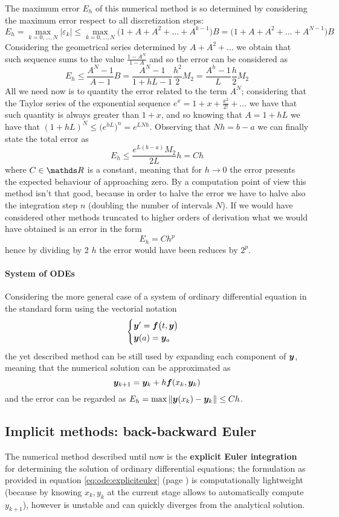 	The maximum error $E_h$ of this numerical method is so determined by considering the maximum error respect to all discretization steps:
	\[ E_h = \max_{k=0,\dots,N} |\varepsilon_k| \leq \max_{k=0,\dots,N} \big(1 + A + A^2 + \dots + A^{k-1}\big) B = \big(1 + A + A^2 + \dots + A^{N-1}\big) B\]
	Considering the geometrical series determined by $A+ A^2+\dots$ we obtain that such sequence sums to the value $\frac{1-A^N}{1-A}$ and so the error can be considered as
	\[ E_h \leq \frac{A^N-1}{A-1} B = \frac{A^N - 1}{1+hL - 1} \frac{h^2}{2}M_2 = \frac{A^h - 1}{L} \frac{h}2 M_2 \]
	All we need now is to quantity the error related to the  term $A^N$; considering that the Taylor series of the exponential sequence $e^x = 1 + x + \frac{x^2}{2!}+\dots$ we have that such quantity is always greater than $1+x$, and so knowing that $A= 1+hL$ we have that $(1+hL)^N \leq \big(e^{hL}\big)^n = e^{LNh}$. Observing that $Nh=b-a$ we can finally state the total error as
	\begin{equation}
		E_h\leq \frac{e^{L(b-a)} M_2}{2L} h = Ch
	\end{equation}
	where $C\in \R$ is a constant, meaning that for $h\rightarrow 0$ the error presents the expected behaviour of approaching zero. By a computation point of view this method isn't that good, because in order to halve the error we have to halve also the integration step $n$ (doubling the number of intervals $N$). If we would have considered other methods truncated to higher orders of derivation what we would have obtained is an error in the form
	\[ E_h = C h^p \]
	hence by dividing by 2 $h$ the error would have been reduces by $2^p$.
	
	\paragraph{System of ODEs} Considering the more general case of a system of ordinary differential equation in the standard form using the vectorial notation
	\[ \begin{cases}
		\boldsymbol{y}' = \boldsymbol{f}\big(t,\boldsymbol{y}\big) \\ \boldsymbol{y}(a) = \boldsymbol{y}_a
	\end{cases} \]	
	the yet described method can be still used by expanding each component of $\boldsymbol{y}$, meaning that the numerical solution can be approximated as
	\[ \boldsymbol{y}_{k+1} = \boldsymbol{y}_k + h \boldsymbol{f}(x_k, \boldsymbol{y}_k) \]
	and the error can be regarded as $E_h = \max \|\boldsymbol{y}(x_k) - \boldsymbol{y}_k\| \leq Ch$.
	
	\subsection{Implicit methods: back-backward Euler }
		The numerical method described until now is the \textbf{explicit Euler integration} for determining the solution of ordinary differential equations; the formulation as provided in equation \ref{eq:ode:expliciteuler} (page \pageref{eq:ode:expliciteuler}) is computationally lightweight (because by knowing $x_k,y_k$ at the current stage allows to automatically compute $y_{k+1}$), however is unstable and can quickly diverges from the analytical solution.
		
